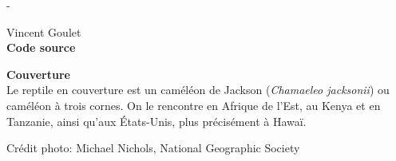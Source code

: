 
\begingroup
\calccentering{\unitlength}
\begin{adjustwidth*}{\unitlength}{-\unitlength}
  \setlength{\parindent}{0pt}
  \setlength{\parskip}{\baselineskip}
  \small

  {\textcopyright} {\year} Vincent Goulet \\

  

  \textbf{Code source} \\
  \viewsource{\ghurl}

  \textbf{Couverture} \\
  Le reptile en couverture est un caméléon de Jackson (\emph{Chamaeleo
    jacksonii}) ou caméléon à trois cornes. On le rencontre en Afrique
  de l'Est, au Kenya et en Tanzanie, ainsi qu'aux États-Unis, plus
  précisément à Hawaï.

  Crédit photo: Michael Nichols, National Geographic Society
\end{adjustwidth*}
\endgroup

